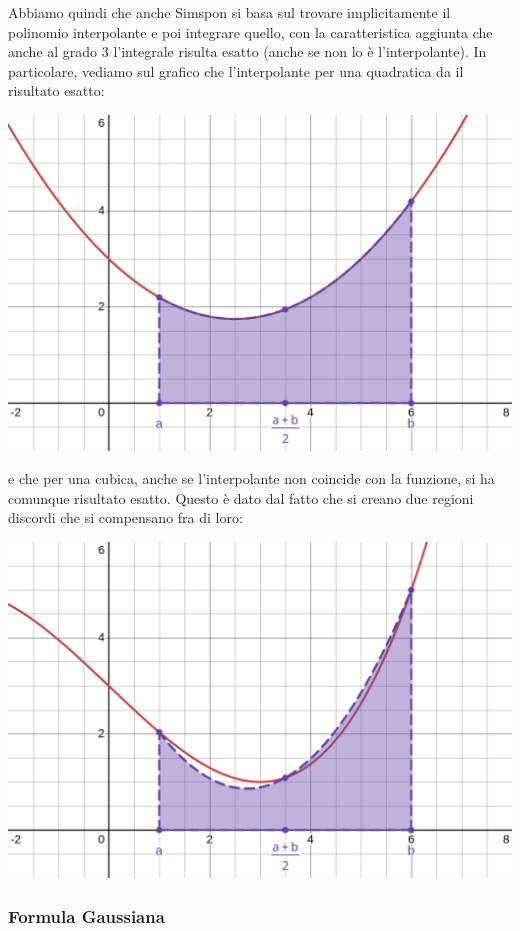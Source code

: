\documentclass[a4paper,11pt]{article}
\begin{document}
Abbiamo quindi che anche Simspon si basa sul trovare implicitamente il polinomio interpolante e poi integrare quello, con la caratteristica aggiunta che anche al grado 3 l'integrale risulta esatto (anche se non lo è l'interpolante).
In particolare, vediamo sul grafico che l'interpolante per una quadratica da il risultato esatto:
\begin{center}
	\includegraphics[scale=0.28]{../figures/simpson_quadratic.png}
\end{center}
e che per una cubica, anche se l'interpolante non coincide con la funzione, si ha comunque risultato esatto.
Questo è dato dal fatto che si creano due regioni discordi che si compensano fra di loro:
\begin{center}
	\includegraphics[scale=0.28]{../figures/simpson_cubic.png}
\end{center}

\subsubsection{Formula Gaussiana}
\end{document}
